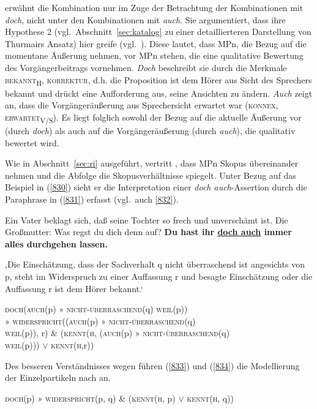 \citet[221--222]{Thurmair1989} erwähnt die Kombination nur im Zuge der Betrachtung der Kombinationen mit \textit{doch}, nicht unter den Kombinationen mit \textit{auch}. Sie argumentiert, dass ihre Hypothese 2 (vgl.\ Abschnitt~\ref{sec:katalog} zu einer detaillier\-teren Darstellung von Thurmairs Ansatz) hier greife (vgl.\ \citeyear[288]{Thurmair1989}). Diese lautet, dass MPn, die Bezug auf die momentane Äußerung nehmen, vor MPn stehen, die eine qualitative Bewertung des Vorgängerbeitrags vornehmen. \textit{Doch} beschreibt sie durch die Merkmale \textsc{bekannt}\textsubscript{H}, \textsc{korrektur}, d.h. die Proposition ist dem Hörer aus Sicht des Sprechers bekannt und drückt eine Aufforderung aus, seine Ansichten zu ändern. \textit{Auch} zeigt an, dass die Vorgängeräuße\-rung aus Sprechersicht erwartet war (\textsc{konnex}, \textsc{erwartet}\textsubscript{V\slash S}). Es liegt folglich sowohl der Bezug auf die aktuelle Äußerung vor (durch \textit{doch}) als auch auf die Vorgängeräußerung (durch \textit{auch}), die qualitativ bewertet wird. 

Wie in Abschnitt~\ref{sec:ri} ausgeführt, vertritt \citet{Rinas2007}, dass MPn Skopus übereinander nehmen und die Abfolge die Skopusverhältnisse spiegelt. Unter Bezug auf das Beispiel in (\ref{830}) sieht er die Interpretation einer \textit{doch auch}-Assertion durch die Paraphrase in (\ref{831}) erfasst (vgl.\ auch \ref{832}).

\begin{exe}
	\ex\label{830}
	Ein Vater beklagt sich, daß seine Tochter so frech und unverschämt ist. Die Großmutter: Was regst du dich denn auf? \textbf{Du hast ihr \ul{doch auch} immer alles durchgehen lassen.}
	\hfill\hbox{\citet[221]{Thurmair1989}}
\end{exe}

\begin{exe}
	\ex\label{831}
	‚Die Einschätzung, dass der Sachverhalt q nicht überraschend ist angesichts von p, steht im Widerspruch zu einer Auffassung r und besagte 				Einschätzung oder die Auffassung r ist dem Hörer bekannt.‘
\end{exe}

\begin{exe}
	\ex\label{832}
	\textsc{doch}(\textsc{auch}(p) » \textsc{nicht-überraschend}(q) \textsc{weil}(p))\\
	» \textsc{widerspricht}((\textsc{auch}(p) » \textsc{nicht-überraschend}(q)\\
	 \textsc{weil}(p)), r) \& (\textsc{kennt}(\textsc{h}, (\textsc{auch}(p) » \textsc{nicht-überraschend}(q)\\ \textsc{weil}(p))) $\vee$ \textsc{kennt}(\textsc{h},r))
\end{exe}	
Des besseren Verständnisses wegen führen (\ref{833}) und (\ref{834}) die Modellierung der Einzelpartikeln nach \citet{Rinas2007} an.
\begin{exe}
	\ex\label{833}
	\textsc{doch}(p) » \textsc{widerspricht}(p, q) \& (\textsc{kennt}(\textsc{h}, p) $\vee$ \textsc{kennt}(\textsc{h}, q))
\end{exe}	

